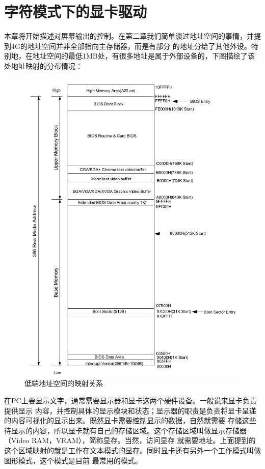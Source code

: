 
\section {字符模式下的显卡驱动}

\par 本章将开始描述对屏幕输出的控制。在第二章我们简单谈过地址空间的事情，并提到4G的地址空间并非全部指向主存储器，而是有部分\allowbreak
的地址分给了其他外设。特别地，在地址空间的最低1MB处，有很多地址是属于外部设备的，下图描绘了该处地址映射的分布情况：

\begin{figure}[ht]
      \centering
      \includegraphics[scale=0.65]{picture/chapt4/BIOS-mem.png}
      \caption{低端地址空间的映射关系}
\end{figure}

\par 在PC上要显示文字，通常需要显示器和显卡这两个硬件设备。一般说来显卡负责提供显示\allowbreak
内容，并控制具体的显示模块和状态；显示器的职责是负责将显卡呈递的内容可视化的显示出来。既然显卡需要控制显示的数据，自然就需要\allowbreak
存储这些待显示的内容，所以显卡就有自己的存储区域。这个存储区域叫做显示存储器（Video RAM，VRAM），简称显存。当然，访问显存\allowbreak
就需要地址。上面提到的这个区域映射的就是工作在文本模式的显存。同时显卡还有另外一个工作模式叫做图形模式，这个模式是目前\allowbreak
最常用的模式。

